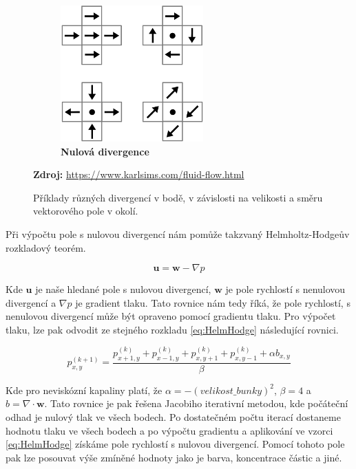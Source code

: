 \begin{figure}[h]
\begin{subfigure}{.3\textwidth}
  	\centering
	\includegraphics[width=0.8\linewidth]{obrazky-figures/div-zero.png}
	\caption{\textbf{Nulová divergence}}
	\label{fig:Lagran}
\end{subfigure}
\caption{Příklady různých divergencí v bodě, v závislosti na velikosti a směru vektorového pole v okolí.}
\textbf{Zdroj:} \url{https://www.karlsims.com/fluid-flow.html}
\label{fig:div}
\end{figure}

Při výpočtu pole s nulovou divergencí nám pomůže takzvaný Helmholtz-Hodgeův rozkladový teorém.

\begin{equation}
\mathbf{u} = \mathbf{w} - \nabla p    
\label{eq:HelmHodge}
\end{equation}

Kde $\mathbf{u}$ je naše hledané pole s nulovou divergencí, $\mathbf{w}$ je pole rychlostí s nenulovou divergencí a $\nabla p$ je gradient tlaku. Tato rovnice nám tedy říká, že pole rychlostí, s nenulovou divergencí může být opraveno pomocí gradientu tlaku. Pro výpočet tlaku, lze pak odvodit ze stejného rozkladu \ref{eq:HelmHodge} následující rovnici.

\begin{equation}
    p_{x,y}^{(k+1)} = \frac{p_{x+1,y}^{(k)} + p_{x-1,y}^{(k)} + p_{x,y+1}^{(k)} + p_{x,y-1}^{(k)} + \alpha b_{x,y}}{\beta}
\end{equation}

Kde pro neviskózní kapaliny platí, že $\alpha = -( velikost\_bunky )^2$, $\beta = 4$ a $b = \nabla \cdot \mathbf{w}$. Tato rovnice je pak řešena Jacobiho iterativní metodou, kde počáteční odhad je nulový tlak ve všech bodech. Po dostatečném počtu iterací dostaneme hodnotu tlaku ve všech bodech a po výpočtu gradientu a aplikování ve vzorci \ref{eq:HelmHodge} získáme pole rychlostí s nulovou divergencí. Pomocí tohoto pole pak lze posouvat výše zmíněné hodnoty jako je barva, koncentrace částic a jiné.
\cite{GPUGemsGridFLuid}

